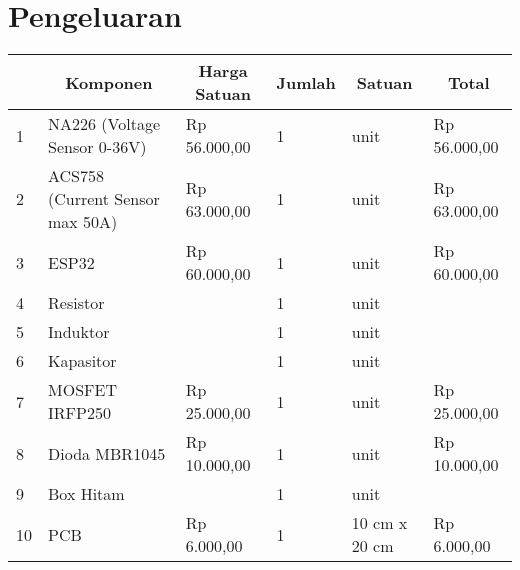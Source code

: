 \section{Pengeluaran}
\begin{table}[H]
	\centering
	
	\label{Harga Komponen}
	\begin{tabularx}{\linewidth}{
			|p{}%
			|p{} %
			|p{}%
			|p{}%
			|p{}%
			|p{}|%
		}
		\hline
		\rowcolor{blue!20} %
		\multicolumn{1}{|c|}{\textbf{No.}} & 
		\multicolumn{1}{|c|}{\textbf{Komponen}} &
		\multicolumn{1}{c|}{\textbf{Harga Satuan}} & 
		\multicolumn{1}{c|}{\textbf{Jumlah}} &
		\multicolumn{1}{c|}{\textbf{Satuan}} &
		\multicolumn{1}{c|}{\textbf{Total}}\\ \hline
		1 & NA226 (Voltage Sensor 0-36V) & Rp 56.000,00 & 1 & unit  & Rp 56.000,00  \\ \hline
		2 & ACS758 (Current Sensor max 50A)&  Rp 63.000,00 & 1 & unit  & Rp 63.000,00  \\\hline
		3 & ESP32  & Rp 60.000,00  & 1 & unit &  Rp 60.000,00  \\ \hline
		4 &  Resistor &  & 1 & unit &  \\ \hline
		5 &  Induktor &  & 1 & unit &  \\ \hline
		6 &  Kapasitor &  & 1 & unit &  \\ \hline
		7 &  MOSFET IRFP250 & Rp 25.000,00 & 1 & unit & Rp 25.000,00 \\ \hline
		8 &  Dioda MBR1045 & Rp 10.000,00 & 1 & unit & Rp 10.000,00 \\ \hline
		9 &  Box Hitam &  & 1 & unit & \\ \hline
		10 &  PCB & Rp 6.000,00 & 1 &10 cm x 20 cm & Rp 6.000,00\\ \hline
		
		
	\end{tabularx}
\end{table}